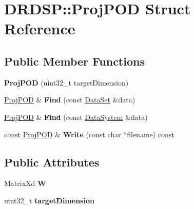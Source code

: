 \hypertarget{struct_d_r_d_s_p_1_1_proj_p_o_d}{\section{D\-R\-D\-S\-P\-:\-:Proj\-P\-O\-D Struct Reference}
\label{struct_d_r_d_s_p_1_1_proj_p_o_d}
}
\subsection*{Public Member Functions}
\begin{DoxyCompactItemize}
\item 
\hypertarget{struct_d_r_d_s_p_1_1_proj_p_o_d_ab18933b48188141ad6759f99a29df128}{{\bfseries Proj\-P\-O\-D} (uint32\-\_\-t target\-Dimension)}\label{struct_d_r_d_s_p_1_1_proj_p_o_d_ab18933b48188141ad6759f99a29df128}

\item 
\hypertarget{struct_d_r_d_s_p_1_1_proj_p_o_d_ad852a4b068691732d2be2b0fc6a50fef}{\hyperlink{struct_d_r_d_s_p_1_1_proj_p_o_d}{Proj\-P\-O\-D} \& {\bfseries Find} (const \hyperlink{struct_d_r_d_s_p_1_1_data_set}{Data\-Set} \&data)}\label{struct_d_r_d_s_p_1_1_proj_p_o_d_ad852a4b068691732d2be2b0fc6a50fef}

\item 
\hypertarget{struct_d_r_d_s_p_1_1_proj_p_o_d_a00d7aa64d9f4c3e396bb37aa2e493747}{\hyperlink{struct_d_r_d_s_p_1_1_proj_p_o_d}{Proj\-P\-O\-D} \& {\bfseries Find} (const \hyperlink{struct_d_r_d_s_p_1_1_data_system}{Data\-System} \&data)}\label{struct_d_r_d_s_p_1_1_proj_p_o_d_a00d7aa64d9f4c3e396bb37aa2e493747}

\item 
\hypertarget{struct_d_r_d_s_p_1_1_proj_p_o_d_a01949683f073d757884e0dc86f9fe26d}{const \hyperlink{struct_d_r_d_s_p_1_1_proj_p_o_d}{Proj\-P\-O\-D} \& {\bfseries Write} (const char $\ast$filename) const }\label{struct_d_r_d_s_p_1_1_proj_p_o_d_a01949683f073d757884e0dc86f9fe26d}

\end{DoxyCompactItemize}
\subsection*{Public Attributes}
\begin{DoxyCompactItemize}
\item 
\hypertarget{struct_d_r_d_s_p_1_1_proj_p_o_d_accfcb1fe9ae69a35a85d74732a04c9c7}{Matrix\-Xd {\bfseries W}}\label{struct_d_r_d_s_p_1_1_proj_p_o_d_accfcb1fe9ae69a35a85d74732a04c9c7}

\item 
\hypertarget{struct_d_r_d_s_p_1_1_proj_p_o_d_acdfe762ff68aa2be10d16797312a8215}{uint32\-\_\-t {\bfseries target\-Dimension}}\label{struct_d_r_d_s_p_1_1_proj_p_o_d_acdfe762ff68aa2be10d16797312a8215}

\end{DoxyCompactItemize}
